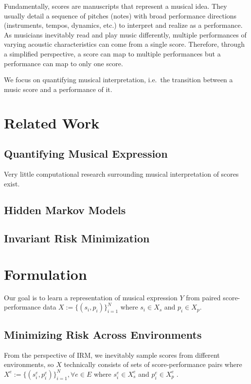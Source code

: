 \documentclass[conference]{IEEEtran}
\begin{document}
Fundamentally, scores are manuscripts that represent a musical idea. They usually detail a sequence of pitches (notes) with broad performance directions (instruments, tempos, dynamics, etc.) to interpret and realize as a performance. As musicians inevitably read and play music differently, multiple performances of varying acoustic characteristics can come from a single score. Therefore, through a simplified perspective, a score can map to multiple performances but a performance can map to only one score.

We focus on quantifying musical interpretation, i.e.\ the transition between a music score and a performance of it.

\section{Related Work}

\subsection{Quantifying Musical Expression}

Very little computational research surrounding musical interpretation of scores exist. \parencite{Cacino-Chacon, Friberg}

\subsection{Hidden Markov Models}

\subsection{Invariant Risk Minimization}

\section{Formulation}

Our goal is to learn a representation of musical expression \(Y\) from paired score-performance data \(X := \{(s_i, p_i)\}_{i=1}^N\) where \(s_i \in X_s\) and \(p_i \in X_p\).

\subsection{Minimizing Risk Across Environments}

From the perspective of IRM, we inevitably sample scores from different environments, so \(X\) technically consists of sets of score-performance pairs where \(X^e := \{(s_i^e, p_i^e)\}_{i=1}^N, \forall e \in E\) where \(s_i^e \in X_s^e\) and \(p_i^e \in X_p^e\) \parencite{Arjovsky, Huszar}.
\end{document}
